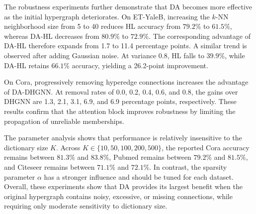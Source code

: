 The robustness experiments further demonstrate that DA becomes more effective
as the initial hypergraph deteriorates. On ET-YaleB, increasing the $k$-NN
neighborhood size from 5 to 40 reduces HL accuracy from $79.2\%$ to $61.5\%$,
whereas DA-HL decreases from $80.9\%$ to $72.9\%$. The corresponding advantage
of DA-HL therefore expands from 1.7 to 11.4 percentage points. A similar trend
is observed after adding Gaussian noise. At variance 0.8, HL falls to $39.9\%$,
while DA-HL retains $66.1\%$ accuracy, yielding a 26.2-point improvement.

On Cora, progressively removing hyperedge connections increases the advantage
of DA-DHGNN. At removal rates of 0.0, 0.2, 0.4, 0.6, and 0.8, the gains over
DHGNN are 1.3, 2.1, 3.1, 6.9, and 6.9 percentage points, respectively. These
results confirm that the attention block improves robustness by limiting the
propagation of unreliable memberships.

The parameter analysis shows that performance is relatively insensitive to the
dictionary size $K$. Across $K\in\{10,50,100,200,500\}$, the reported Cora
accuracy remains between $81.3\%$ and $83.8\%$, Pubmed remains between $79.2\%$
and $81.5\%$, and Citeseer remains between $71.1\%$ and $72.1\%$. In contrast,
the sparsity parameter $\alpha$ has a stronger influence and should be tuned for
each dataset. Overall, these experiments show that DA provides its largest
benefit when the original hypergraph contains noisy, excessive, or missing
connections, while requiring only moderate sensitivity to dictionary size.
